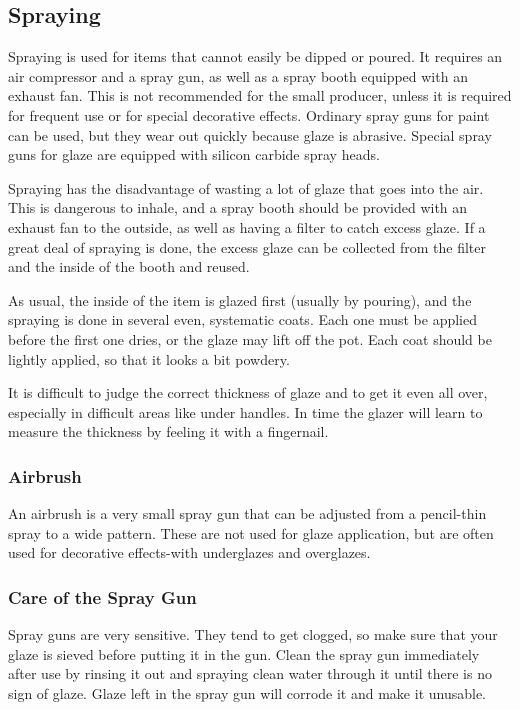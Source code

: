 \subsection{Spraying}
Spraying is used for items that cannot easily be dipped or poured. It requires 
an air compressor and a spray gun, as well as a spray booth equipped with an 
exhaust fan. This is not recommended for the small producer, unless it is 
required for frequent use or for special decorative effects. Ordinary spray 
guns for paint can be used, but they wear out quickly because glaze is 
abrasive. Special spray guns for glaze are equipped with silicon carbide spray 
heads.

Spraying has the disadvantage of wasting a lot of glaze that goes into the air. 
This is dangerous to inhale, and a spray booth should be provided with an 
exhaust fan to the outside, as well as having a filter to catch excess glaze. 
If a great deal of spraying is done, the excess glaze can be collected from the 
filter and the inside of the booth and reused.

As usual, the inside of the item is glazed first (usually by pouring), and the 
spraying is done in several even, systematic coats. Each one must be applied 
before the first one dries, or the glaze may lift off the pot. Each coat should 
be lightly applied, so that it looks a bit powdery.

It is difficult to judge the correct thickness of glaze and to get it even all 
over, especially in difficult areas like under handles. In time the glazer will 
learn to measure the thickness by feeling it with a fingernail.
\subsubsection{Airbrush}
An airbrush is a very small spray gun that can be adjusted from a pencil-thin 
spray to a wide pattern. These are not used for glaze application, but are 
often used for decorative effects-with underglazes and overglazes.
\subsubsection{Care of the Spray Gun}
Spray guns are very sensitive. They tend to get clogged, so make sure that your 
glaze is sieved before putting it in the gun. Clean the spray gun immediately 
after use by rinsing it out and spraying clean water through it until there is 
no sign of glaze. Glaze left in the spray gun will corrode it and make it 
unusable.
